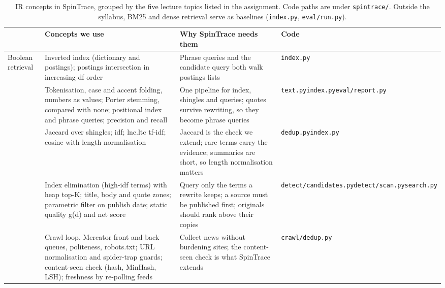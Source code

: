 \documentclass[11pt,a4paper]{article}
\newcommand{\hd}[1]{{\headfont\bfseries\footnotesize #1}}
\newcommand{\hrow}{\rowcolor{paper}}
\newcommand{\code}[1]{\texttt{#1}}
\begin{document}
\begin{table}[t]
  \centering\small
  \caption{IR concepts in SpinTrace, grouped by the five lecture topics listed in the assignment. Code paths are under \code{spintrace/}. Outside the syllabus, BM25 and dense retrieval serve as baselines (\code{index.py}, \code{eval/run.py}).}
  \label{tab:concepts}
  \footnotesize
  \begin{tabularx}{\textwidth}{@{}P{2.5cm}P{5.4cm}LP{3.2cm}@{}}
    \toprule
    \hrow \hd{Lecture topic} & \hd{Concepts we use} & \hd{Why SpinTrace needs them} & \hd{Code} \\
    \midrule
    {\headfont Boolean retrieval} & Inverted index (dictionary and postings); postings intersection in increasing df order & Phrase queries and the candidate query both walk postings lists & \code{index.py} \\
     & Tokenisation, case and accent folding, numbers as values; Porter stemming, compared with none; positional index and phrase queries; precision and recall & One pipeline for index, shingles and queries; quotes survive rewriting, so they become phrase queries & \code{text.py}\newline\code{index.py}\newline\code{eval/report.py} \\
     & Jaccard over shingles; idf; lnc.ltc tf-idf; cosine with length normalisation & Jaccard is the check we extend; rare terms carry the evidence; summaries are short, so length normalisation matters & \code{dedup.py}\newline\code{index.py} \\
     & Index elimination (high-idf terms) with heap top-K; title, body and quote zones; parametric filter on publish date; static quality g(d) and net score & Query only the terms a rewrite keeps; a source must be published first; originals should rank above their copies & \code{detect/candidates.py}\newline\code{detect/scan.py}\newline\code{search.py} \\
     & Crawl loop, Mercator front and back queues, politeness, robots.txt; URL normalisation and spider-trap guards; content-seen check (hash, MinHash, LSH); freshness by re-polling feeds & Collect news without burdening sites; the content-seen check is what SpinTrace extends & \code{crawl/}\newline\code{dedup.py} \\
    \bottomrule
  \end{tabularx}
\end{table}
\end{document}
